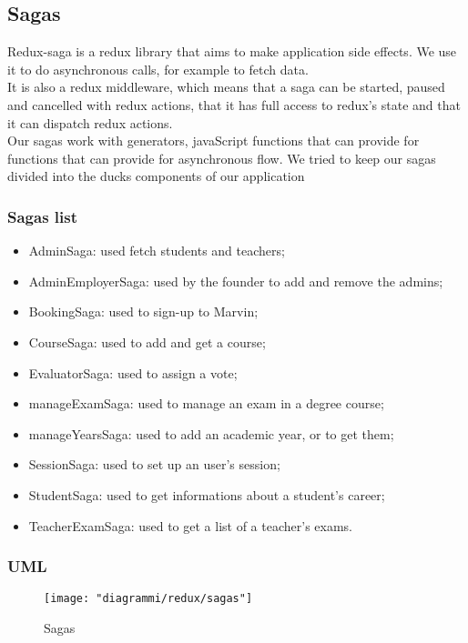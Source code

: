 \documentclass[../redux]{subfiles}
\begin{document}
	\subsection{Sagas}
	Redux-saga is a redux library that aims to make application side effects. We use it to do asynchronous calls, for example to fetch data.\\
	It is also a redux middleware, which means that a saga can be started, paused and cancelled with redux actions, that it has full access to redux's state and that it can dispatch redux actions.\\
	Our sagas work with generators, javaScript functions that can provide for functions that can provide for asynchronous flow. We tried to keep our sagas divided into the ducks components of our application
	
	\subsubsection{Sagas list}
	\begin{itemize}
		\item AdminSaga: used fetch students and teachers;
		\item AdminEmployerSaga: used by the founder to add and remove the admins;
		\item BookingSaga: used to sign-up to Marvin;
		\item CourseSaga: used to add and get a course;
		\item EvaluatorSaga: used to assign a vote;
		\item manageExamSaga: used to manage an exam in a degree course;
		\item manageYearsSaga: used to add an academic year, or to get them;
		\item SessionSaga: used to set up an user's session;
		\item StudentSaga: used to get informations about a student's career;
		\item TeacherExamSaga: used to get a list of a teacher's exams.
	\end{itemize}

	\subsubsection{UML}
	\begin{figure}[H]
		\centering
		\texttt{[image: "diagrammi/redux/sagas"]}
		\caption{Sagas}
		\label{fig:Sagas}
	\end{figure}
\end{document}
